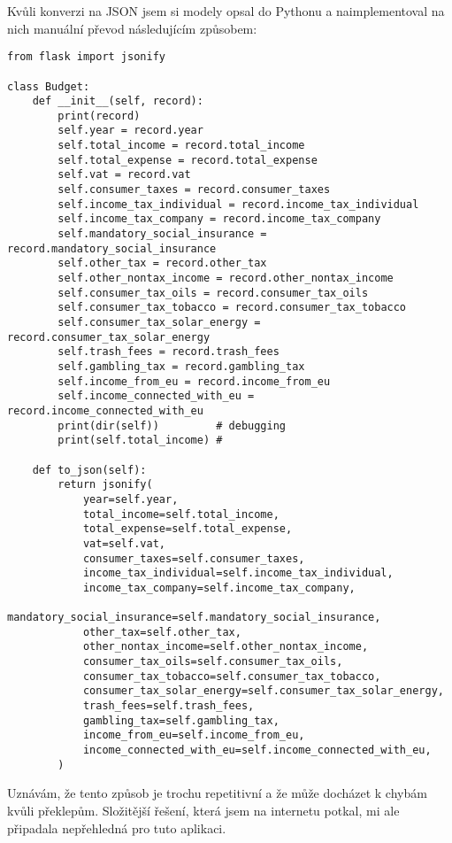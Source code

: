 \documentclass[11pt,a4paper,twoside,openright]{report}
\begin{document}
Kvůli konverzi na JSON jsem si modely opsal do Pythonu a naimplementoval na nich manuální převod
následujícím způsobem:

\begin{verbatim}
from flask import jsonify

class Budget:
    def __init__(self, record):
        print(record)
        self.year = record.year
        self.total_income = record.total_income
        self.total_expense = record.total_expense
        self.vat = record.vat
        self.consumer_taxes = record.consumer_taxes
        self.income_tax_individual = record.income_tax_individual
        self.income_tax_company = record.income_tax_company
        self.mandatory_social_insurance = record.mandatory_social_insurance
        self.other_tax = record.other_tax
        self.other_nontax_income = record.other_nontax_income
        self.consumer_tax_oils = record.consumer_tax_oils
        self.consumer_tax_tobacco = record.consumer_tax_tobacco
        self.consumer_tax_solar_energy = record.consumer_tax_solar_energy
        self.trash_fees = record.trash_fees
        self.gambling_tax = record.gambling_tax
        self.income_from_eu = record.income_from_eu
        self.income_connected_with_eu = record.income_connected_with_eu
        print(dir(self))         # debugging
        print(self.total_income) #

    def to_json(self):
        return jsonify(
            year=self.year,
            total_income=self.total_income,
            total_expense=self.total_expense,
            vat=self.vat,
            consumer_taxes=self.consumer_taxes,
            income_tax_individual=self.income_tax_individual,
            income_tax_company=self.income_tax_company,
            mandatory_social_insurance=self.mandatory_social_insurance,
            other_tax=self.other_tax,
            other_nontax_income=self.other_nontax_income,
            consumer_tax_oils=self.consumer_tax_oils,
            consumer_tax_tobacco=self.consumer_tax_tobacco,
            consumer_tax_solar_energy=self.consumer_tax_solar_energy,
            trash_fees=self.trash_fees,
            gambling_tax=self.gambling_tax,
            income_from_eu=self.income_from_eu,
            income_connected_with_eu=self.income_connected_with_eu,
        )
\end{verbatim}

Uznávám, že tento způsob je trochu repetitivní a že může docházet k chybám kvůli překlepům. Složitější řešení,
která jsem na internetu potkal, mi ale připadala nepřehledná pro tuto aplikaci.
\end{document}
